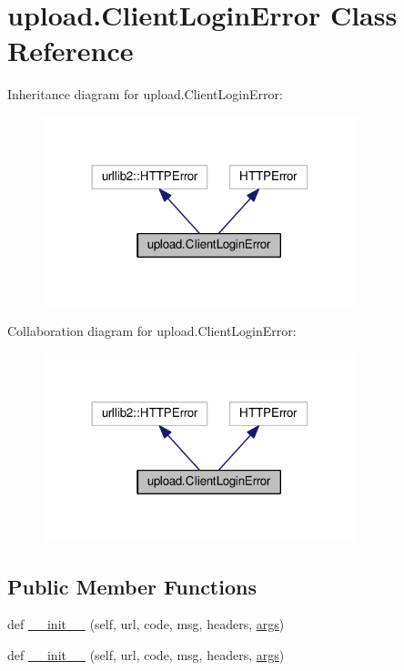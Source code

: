 \hypertarget{classupload_1_1_client_login_error}{}\section{upload.\+Client\+Login\+Error Class Reference}
\label{classupload_1_1_client_login_error}


Inheritance diagram for upload.\+Client\+Login\+Error\+:
\nopagebreak
\begin{figure}[H]
\begin{center}
\leavevmode
\includegraphics[width=258pt]{classupload_1_1_client_login_error__inherit__graph}
\end{center}
\end{figure}


Collaboration diagram for upload.\+Client\+Login\+Error\+:
\nopagebreak
\begin{figure}[H]
\begin{center}
\leavevmode
\includegraphics[width=258pt]{classupload_1_1_client_login_error__coll__graph}
\end{center}
\end{figure}
\subsection*{Public Member Functions}
\begin{DoxyCompactItemize}
\item 
def \hyperlink{classupload_1_1_client_login_error_a1e590616c2976d881e155958cedbbe47}{\+\_\+\+\_\+init\+\_\+\+\_\+} (self, url, code, msg, headers, \hyperlink{classupload_1_1_client_login_error_ac300a0b034b2bc64cedc51e09fb6d663}{args})
\item 
def \hyperlink{classupload_1_1_client_login_error_a1e590616c2976d881e155958cedbbe47}{\+\_\+\+\_\+init\+\_\+\+\_\+} (self, url, code, msg, headers, \hyperlink{classupload_1_1_client_login_error_ac300a0b034b2bc64cedc51e09fb6d663}{args})
\end{DoxyCompactItemize}
